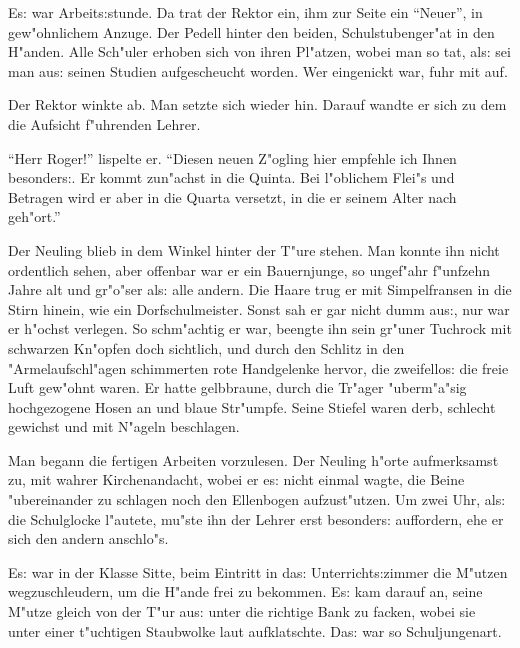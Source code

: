 \documentclass[oneside,12pt]{book}
\newcommand{\s}{s:}%
\begin{document}
\newpage\begin{center}
{\large \so{Er{st}e{\s} Kapitel}}\bigskip\bigskip
\end{center}

E{\s} war Arbeit{\s}stunde. Da trat der Rektor ein, ihm zur Seite
ein "`Neuer"', in gew"ohnlichem Anzuge. Der Pedell hinter den
beiden, Schulstubenger"at in den H"anden. Alle Sch"uler erhoben
sich von ihren Pl"atzen, wobei man so tat, al{\s} sei man au{\s}
seinen Studien aufgescheucht worden. Wer eingenickt war, fuhr mit
auf.

Der Rektor winkte ab. Man setzte sich wieder hin. Darauf wandte er
sich zu dem die Aufsicht f"uhrenden Lehrer.

"`Herr Roger!"' lispelte er. "`Diesen neuen Z"ogling hier empfehle
ich Ihnen besonder{\s}. Er kommt zun"achst in die Quinta. Bei
l"oblichem Flei"s und Betragen wird er aber in die Quarta versetzt,
in die er seinem Alter nach geh"ort."'

Der Neuling blieb in dem Winkel hinter der T"ure stehen. Man
konnte ihn nicht ordentlich sehen, aber offenbar war er ein
Bauernjunge, so ungef"ahr f"unfzehn Jahre alt und gr"o"ser al{\s}
alle andern. Die Haare trug er mit Simpelfransen in die Stirn
hinein, wie ein Dorfschulmeister. Sonst sah er gar nicht dumm
au{\s}, nur war er h"ochst verlegen. So schm"achtig er war,
beengte ihn sein gr"uner Tuchrock mit schwarzen Kn"opfen doch
sichtlich, und durch den Schlitz in den "Armelaufschl"agen
schimmerten rote Handgelenke hervor, die zweifello{\s} die freie
Luft gew"ohnt waren. Er hatte gelbbraune, durch die Tr"ager
"uberm"a"sig hochgezogene Hosen an und blaue Str"umpfe. Seine
Stiefel waren derb, schlecht gewichst und mit N"ageln beschlagen.

Man begann die fertigen Arbeiten vorzulesen. Der Neuling h"orte
aufmerksamst zu, mit wahrer Kirchenandacht, wobei er e{\s} nicht
einmal wagte, die Beine "ubereinander zu schlagen noch den
Ellenbogen aufzust"utzen. Um zwei Uhr, al{\s} die Schulglocke
l"autete, mu"ste ihn der Lehrer erst besonder{\s} auffordern, ehe
er sich den andern anschlo"s.

E{\s} war in der Klasse Sitte, beim Eintritt in da{\s}
Unterricht{\s}zimmer die M"utzen wegzuschleudern, um die H"ande
frei zu bekommen. E{\s} kam darauf an, seine M"utze gleich von der
T"ur au{\s} unter die richtige Bank zu facken, wobei sie unter
einer t"uchtigen Staubwolke laut aufklatschte. Da{\s} war so
Schuljungenart.
\end{document}
